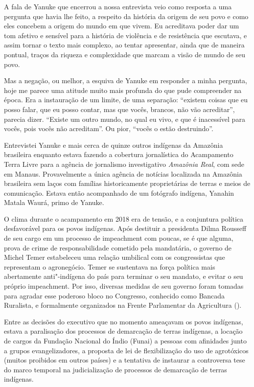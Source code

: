 A fala de Yanuke que encerrou a nossa entrevista veio como resposta a
uma pergunta que havia lhe feito, a respeito da história da origem de
seu povo e como eles concebem a origem do mundo em que vivem. Eu
acreditava poder dar um tom afetivo e sensível para a história de
violência e de resistência que escutava, e assim tornar o texto mais
complexo, ao tentar apresentar, ainda que de maneira pontual, traços da
riqueza e complexidade que marcam a visão de mundo de seu povo.

Mas a negação, ou melhor, a esquiva de Yanuke em responder a minha
pergunta, hoje me parece uma atitude muito mais profunda do que pude
compreender na época. Era a instauração de um limite, de uma separação:
``existem coisas que eu posso falar, que eu posso contar, mas que vocês,
brancos, não vão acreditar'', parecia dizer. ``Existe um outro mundo, no
qual eu vivo, e que é inacessível para vocês, pois vocês não
acreditam''. Ou pior, ``vocês o estão destruindo''.

\asterisc

Entrevistei Yanuke e mais cerca de quinze outros indígenas da Amazônia
brasileira enquanto estava fazendo a cobertura jornalística do
Acampamento Terra Livre para a agência de jornalismo investigativo
\emph{Amazônia Real}, com sede em Manaus. Provavelmente a única agência de
notícias localizada na Amazônia brasileira sem laços com famílias
historicamente proprietárias de terras e meios de comunicação. Estava
então acompanhado de um fotógrafo indígena, Yanahin Matala Waurá, primo
de Yanuke.

O clima durante o acampamento em 2018 era de tensão, e a conjuntura
política desfavorável para os povos indígenas. Após destituir a
presidenta Dilma Rousseff de seu cargo em um processo de impeachment com
poucas, se é que alguma, prova de crime de responsabilidade cometido
pela mandatária, o governo de Michel Temer estabeleceu uma relação
umbilical com os congressistas que representam o agronegócio. Temer se
sustentava na força política mais abertamente anti"-indígena do país para
terminar o seu mandato, e evitar o seu próprio impeachment. Por isso,
diversas medidas de seu governo foram tomadas para agradar esse poderoso
bloco no Congresso, conhecido como Bancada Ruralista, e formalmente
organizados na Frente Parlamentar da Agricultura ().

Entre as decisões do executivo que no momento ameaçavam os povos indígenas, estava a paralisação dos processos de
demarcação de terras indígenas, a locação de cargos da Fundação Nacional
do Índio (Funai) a pessoas com afinidades junto a grupos
evangelizadores, a proposta de lei de flexibilização do uso de
agrotóxicos (muitos proibidos em outros países) e a tentativa de
instaurar a controversa tese do marco temporal na judicialização de
processos de demarcação de terras indígenas.


